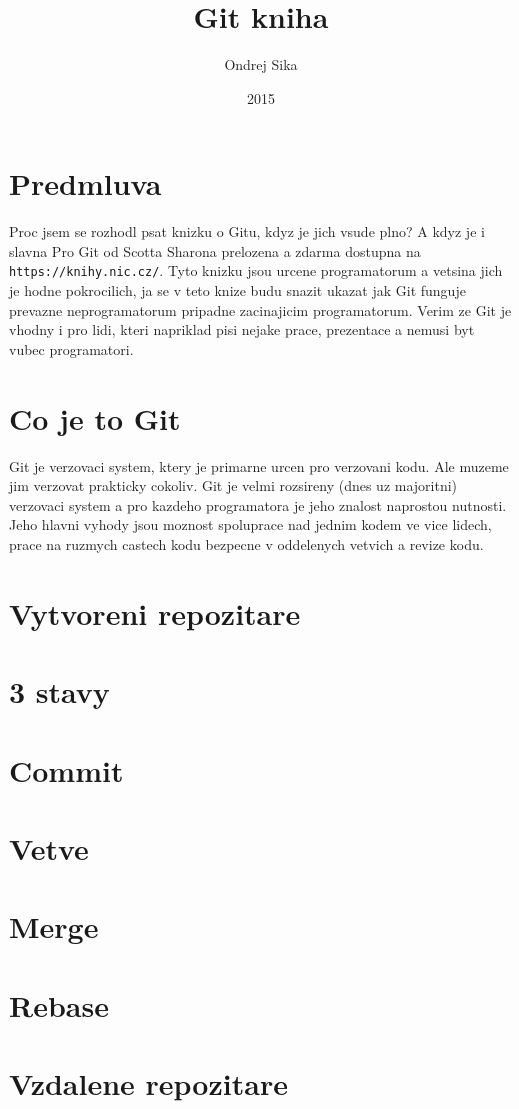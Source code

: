 \documentclass[12pt,a5paper]{article}
\title{Git kniha}
\author{Ondrej Sika}
\date{2015}
\begin{document}


\section{Predmluva}

Proc jsem se rozhodl psat knizku o Gitu, kdyz je jich vsude plno? A kdyz je i slavna Pro Git od Scotta Sharona prelozena a zdarma dostupna na \lstinline|https://knihy.nic.cz/|. Tyto knizku jsou urcene programatorum a vetsina jich je hodne pokrocilich, ja se v teto knize budu snazit ukazat jak Git funguje prevazne neprogramatorum pripadne zacinajicim programatorum. Verim ze Git je vhodny i pro lidi, kteri napriklad pisi nejake prace, prezentace a nemusi byt vubec programatori.

\section{Co je to Git}

Git je verzovaci system, ktery je primarne urcen pro verzovani kodu. Ale muzeme jim verzovat prakticky cokoliv. Git je velmi rozsireny (dnes uz majoritni) verzovaci system a pro kazdeho programatora je jeho znalost naprostou nutnosti. Jeho hlavni vyhody jsou moznost spoluprace nad jednim kodem ve vice lidech, prace na ruzmych castech kodu bezpecne v oddelenych vetvich a revize kodu.

\section{Vytvoreni repozitare}
\section{3 stavy}
\section{Commit}
\section{Vetve}
\section{Merge}
\section{Rebase}
\section{Vzdalene repozitare}
\end{document}
